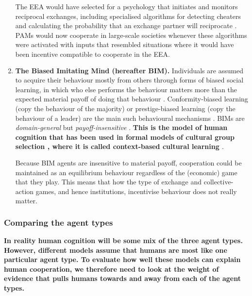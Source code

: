 \documentclass[10pt, a4paper, fleqn]{article}
\begin{document}
\begin{enumerate}

The EEA would have selected for a psychology that initiates and monitors reciprocal exchanges, including specialised algorithms for detecting cheaters and calculating the probability that an exchange partner will reciprocate \citep{Cosmides:1992:a}. PAMs would now cooperate in large-scale societies whenever these algorithms were activated with inputs that resembled situations where it would have been incentive compatible to cooperate in the EEA.


\item \textbf{The Biased Imitating Mind (hereafter BIM).} Individuals are assumed to acquire their behaviour mostly from others through forms of biased social learning, in which who else performs the behaviour matters more than the expected material payoff of doing that behaviour \citep{Henrich:2003:a,Richerson:2005:a,Henrich:2016:a}. Conformity-biased learning (copy the behaviour of the majority) or prestige-biased learning (copy the behaviour of a leader) are the main such behavioural mechanisms \citep{Henrich:2001:b,Richerson:2005:a,Boyd:2011:a}. BIMs are \textit{domain-general} but \textit{payoff-insensitive} \citep{Henrich:2004:a}. \textbf{This is the model of human cognition that has been used in formal models of cultural group selection \citep{Boyd:1985:a,Henrich:2001:a,Henrich:2004:aa,Andresguzman:2007:a,Boyd:2011:a}, where it is called context-based cultural learning \citep{Henrich:2003:a,Richerson:2005:a}}.  

Because BIM agents are insensitive to material payoff, cooperation could be maintained as an equilibrium behaviour regardless of the (economic) game that they play. This means that how the type of exchange and collective-action games, and hence institutions, incentivise behaviour does not really matter.

\end{enumerate}

\subsubsection*{Comparing the agent types}

\textbf{In reality human cognition will be some mix of the three agent types. However, different models assume that humans are most like one particular agent type. To evaluate how well these models can explain human cooperation, we therefore need to look at the weight of evidence that pulls humans towards and away from each of the agent types.}
\end{document}
